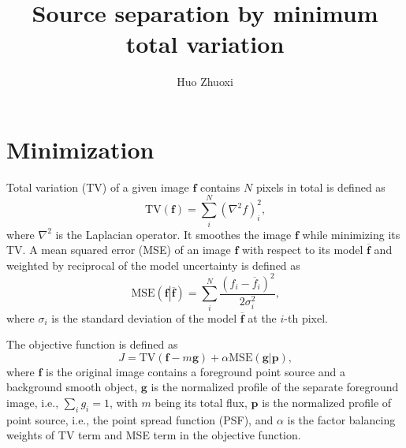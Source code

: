 \documentclass{article}
\newcommand{\vect}[1]{\mathbf{#1}}
\newcommand{\tv}{\mathrm{TV}}
\newcommand{\mse}[2]{\mathrm{MSE}\left(#1 \left| #2 \right. \right)}
\begin{document}
\title{Source separation by minimum total variation}
\author{Huo Zhuoxi}
\maketitle
\section{Minimization}
Total variation (TV) of a given image $\vect{f}$ contains $N$ pixels in total is defined as
\begin{equation}
\mathrm{TV}(\vect{f}) = \sum_i^N \left( \nabla^2 f \right)_i^2\text{,}
\end{equation}
where $\nabla^2$ is the Laplacian operator.
It smoothes the image $\vect{f}$ while minimizing its TV.
A mean squared error (MSE) of an image $\vect{f}$ with respect to its model $\overline{\vect{f}}$ and weighted by reciprocal of the model uncertainty is defined as
\begin{equation}
\mse{\vect{f}}{\overline{\vect{f}}} = \sum_i^N \frac{\left( f_i - \overline{f}_i \right)^2}{2 \sigma_i^2}\text{,}
\end{equation}
where $\sigma_i$ is the standard deviation of the model $\overline{\vect{f}}$ at the $i$-th pixel.

The objective function is defined as
\begin{equation}
J  = \tv(\vect{f} - m \vect{g}) + \alpha \mse{\vect{g}}{\vect{p}}\text{,}
\label{eq-min-obj}
\end{equation}
where $\vect{f}$ is the original image contains a foreground point source and a background smooth object, $\vect{g}$ is the normalized profile of the separate foreground image, i.e., $\sum_i g_i = 1$, with $m$ being its total flux, $\vect{p}$ is the normalized profile of point source, i.e., the point spread function (PSF), and $\alpha$ is the factor balancing weights of TV term and MSE term in the objective function.
\end{document}
